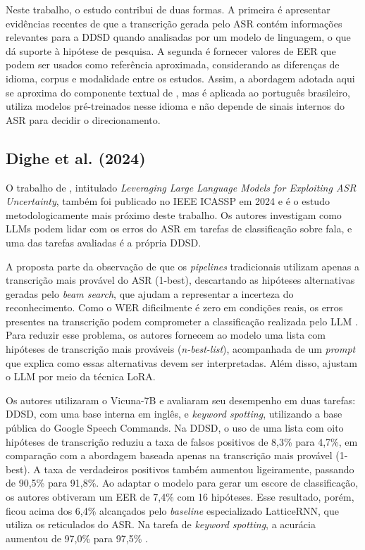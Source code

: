 \documentclass[
    12pt,                %
    openright,           %
    oneside,             %
    a4paper,             %
    english,             %
    brazil               %
]{abntex2}
\begin{document}
Neste trabalho, o estudo contribui de duas formas. A primeira é apresentar evidências recentes de que a transcrição gerada pelo ASR contém informações relevantes para a DDSD quando analisadas por um modelo de linguagem, o que dá suporte à hipótese de pesquisa. A segunda é fornecer valores de EER que podem ser usados como referência aproximada, considerando as diferenças de idioma, corpus e modalidade entre os estudos. Assim, a abordagem adotada aqui se aproxima do componente textual de , mas é aplicada ao português brasileiro, utiliza modelos pré-treinados nesse idioma e não depende de sinais internos do ASR para decidir o direcionamento.


\subsection{Dighe et al. (2024)}

O trabalho de , intitulado \textit{Leveraging Large Language Models for Exploiting ASR Uncertainty}, também foi publicado no IEEE ICASSP em 2024 e é o estudo metodologicamente mais próximo deste trabalho. Os autores investigam como LLMs podem lidar com os erros do ASR em tarefas de classificação sobre fala, e uma das tarefas avaliadas é a própria DDSD.

A proposta parte da observação de que os \textit{pipelines} tradicionais utilizam apenas a transcrição mais provável do ASR (1-best), descartando as hipóteses alternativas geradas pelo \textit{beam search}, que ajudam a representar a incerteza do reconhecimento. Como o WER dificilmente é zero em condições reais, os erros presentes na transcrição podem comprometer a classificação realizada pelo LLM \cite{Dighe2024}. Para reduzir esse problema, os autores fornecem ao modelo uma lista com hipóteses de transcrição mais prováveis (\textit{n-best-list}), acompanhada de um \textit{prompt} que explica como essas alternativas devem ser interpretadas. Além disso, ajustam o LLM por meio da técnica LoRA.

Os autores utilizaram o Vicuna-7B e avaliaram seu desempenho em duas tarefas: DDSD, com uma base interna em inglês, e \textit{keyword spotting}, utilizando a base pública do Google Speech Commands. Na DDSD, o uso de uma lista com oito hipóteses de transcrição reduziu a taxa de falsos positivos de 8,3\% para 4,7\%, em comparação com a abordagem baseada apenas na transcrição mais provável (1-best). A taxa de verdadeiros positivos também aumentou ligeiramente, passando de 90,5\% para 91,8\%. Ao adaptar o modelo para gerar um escore de classificação, os autores obtiveram um EER de 7,4\% com 16 hipóteses. Esse resultado, porém, ficou acima dos 6,4\% alcançados pelo \textit{baseline} especializado LatticeRNN, que utiliza os reticulados do ASR. Na tarefa de \textit{keyword spotting}, a acurácia aumentou de 97,0\% para 97,5\% \cite{Dighe2024}.
\end{document}
